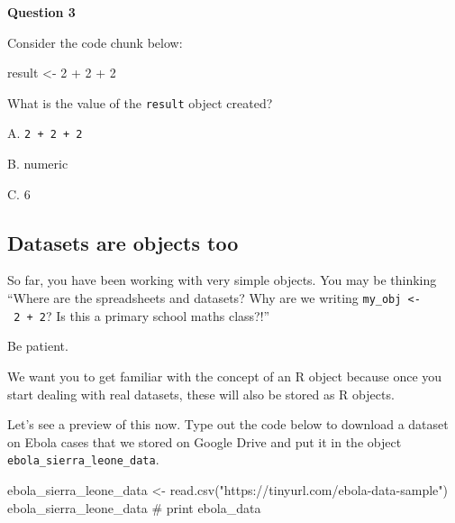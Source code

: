 \documentclass[
  letterpaper,
  DIV=11,
  numbers=noendperiod]{scrreprt}
\newenvironment{Shaded}{\begin{snugshade}}{\end{snugshade}}
\newcommand{\CommentTok}[1]{\textcolor[rgb]{0.37,0.37,0.37}{#1}}
\newcommand{\DecValTok}[1]{\textcolor[rgb]{0.68,0.00,0.00}{#1}}
\newcommand{\FunctionTok}[1]{\textcolor[rgb]{0.28,0.35,0.67}{#1}}
\newcommand{\NormalTok}[1]{\textcolor[rgb]{0.00,0.23,0.31}{#1}}
\newcommand{\OtherTok}[1]{\textcolor[rgb]{0.00,0.23,0.31}{#1}}
\newcommand{\SpecialCharTok}[1]{\textcolor[rgb]{0.37,0.37,0.37}{#1}}
\newcommand{\StringTok}[1]{\textcolor[rgb]{0.13,0.47,0.30}{#1}}
\begin{document}
\begin{tcolorbox}[enhanced jigsaw, titlerule=0mm, colback=white, left=2mm, breakable, opacitybacktitle=0.6, colbacktitle=quarto-callout-tip-color!10!white, colframe=quarto-callout-tip-color-frame, bottomtitle=1mm, opacityback=0, coltitle=black, arc=.35mm, toptitle=1mm, title=\textcolor{quarto-callout-tip-color}{\faLightbulb}\hspace{0.5em}{Practice}, leftrule=.75mm, toprule=.15mm, bottomrule=.15mm, rightrule=.15mm]

\textbf{Question 3}

Consider the code chunk below:

\begin{Shaded}
\begin{Highlighting}[]
\NormalTok{result }\OtherTok{\textless{}{-}}  \DecValTok{2} \SpecialCharTok{+} \DecValTok{2} \SpecialCharTok{+} \DecValTok{2}
\end{Highlighting}
\end{Shaded}

What is the value of the \texttt{result} object created?

A. \texttt{2\ +\ 2\ +\ 2}

B. numeric

C. 6

\end{tcolorbox}

\subsection{Datasets are objects too}\label{datasets-are-objects-too}

So far, you have been working with very simple objects. You may be
thinking ``Where are the spreadsheets and datasets? Why are we writing
\texttt{my\_obj\ \textless{}-\ 2\ +\ 2}? Is this a primary school maths
class?!''

Be patient.

We want you to get familiar with the concept of an R object because once
you start dealing with real datasets, these will also be stored as R
objects.

Let's see a preview of this now. Type out the code below to download a
dataset on Ebola cases that we stored on Google Drive and put it in the
object \texttt{ebola\_sierra\_leone\_data}.

\begin{Shaded}
\begin{Highlighting}[]
\NormalTok{ebola\_sierra\_leone\_data }\OtherTok{\textless{}{-}} \FunctionTok{read.csv}\NormalTok{(}\StringTok{"https://tinyurl.com/ebola{-}data{-}sample"}\NormalTok{)}
\NormalTok{ebola\_sierra\_leone\_data }\CommentTok{\# print ebola\_data}
\end{Highlighting}
\end{Shaded}
\end{document}
